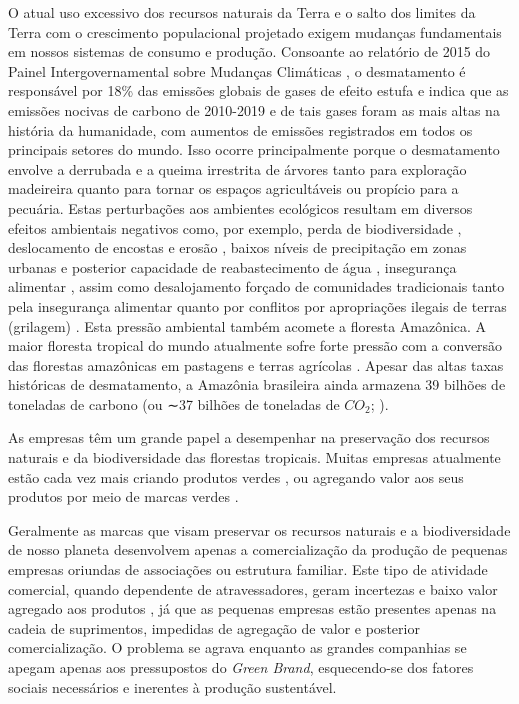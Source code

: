 O atual uso excessivo dos recursos naturais da Terra e o salto dos limites da Terra com o crescimento populacional projetado \cite{Steffen2015PlanetaryPlanet} exigem mudanças fundamentais em nossos sistemas de consumo e produção.
Consoante ao relatório de 2015 do Painel Intergovernamental sobre Mudanças Climáticas \cite{ONU2021SpecialIPCC}, o desmatamento é responsável por 18\% das emissões globais de gases de efeito estufa e indica que as emissões nocivas de carbono de 2010-2019 e de tais gases foram as mais altas na história da humanidade, com aumentos de emissões registrados em todos os principais setores do mundo. Isso ocorre principalmente porque o desmatamento envolve a derrubada e a queima irrestrita de árvores tanto para exploração madeireira quanto para tornar os espaços agricultáveis ou propício para a pecuária. Estas perturbações aos ambientes ecológicos resultam em diversos efeitos ambientais negativos como, por exemplo, perda de biodiversidade \cite{Pyles2018LossHistories}, deslocamento de encostas e erosão \cite{Holanda2021Boat-generatedReservoir}, baixos níveis de precipitação em zonas urbanas e posterior capacidade de reabastecimento de água \cite{Pattnayak2018AddingBrazil}, insegurança alimentar \cite{TataNgome2019AssessingCameroon}, assim como desalojamento forçado de comunidades tradicionais tanto pela insegurança alimentar quanto por conflitos por apropriações ilegais de terras (grilagem) \cite{Ingalls2018TheRegion,Azevedo-Ramos2018NoDeforestation}. Esta pressão ambiental também acomete a floresta Amazônica. A maior floresta tropical do mundo atualmente sofre forte pressão com a conversão das florestas amazônicas em pastagens e terras agrícolas \cite{SEEG2021SystemSEEG}. Apesar das altas taxas históricas de desmatamento, a Amazônia brasileira ainda armazena 39 bilhões de toneladas de carbono (ou ∼37 bilhões de toneladas de $CO_2$; \cite{IPAM2022CCALAmazonia}).    

As empresas têm um grande papel a desempenhar na preservação dos recursos naturais e da biodiversidade das florestas tropicais. Muitas empresas atualmente estão cada vez mais criando produtos verdes , ou agregando valor aos seus produtos por meio de marcas verdes \cite{Majid2015GivingMarket}.

Geralmente as marcas que visam preservar os recursos naturais e a biodiversidade de nosso planeta desenvolvem apenas a comercialização da produção de pequenas empresas oriundas de associações ou estrutura familiar. Este tipo de atividade comercial, quando dependente de atravessadores, geram incertezas e baixo valor agregado aos produtos \cite{Caniato2012659,Pervez2019Fuzzy-LikertBangladesh}, já que as pequenas empresas estão presentes apenas na cadeia de suprimentos, impedidas de agregação de valor e posterior comercialização. O problema se agrava enquanto as grandes companhias se apegam apenas aos pressupostos do \textit{Green Brand}, esquecendo-se dos fatores sociais necessários e inerentes à produção sustentável. 

